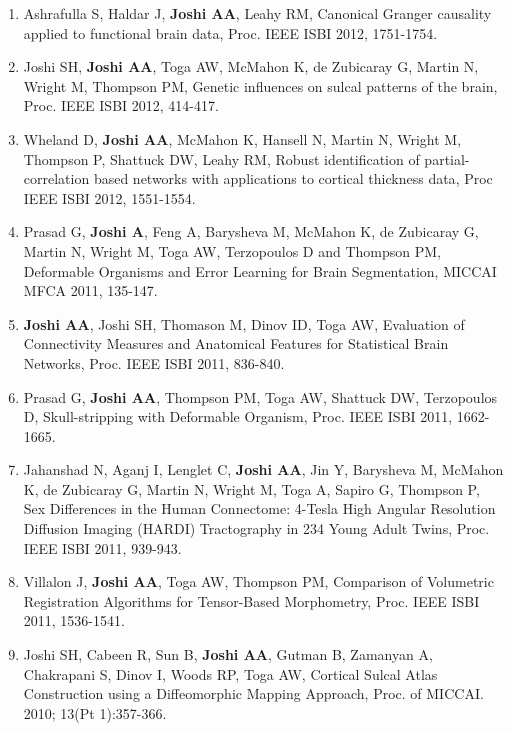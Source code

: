\documentclass[overlapped,line,letterpaper]{res}
\begin{document}
\begin{resume}
\begin{enumerate}
    \item Ashrafulla S, Haldar J, \textbf{Joshi AA}, Leahy RM, {Canonical Granger causality applied to functional brain data}, Proc. IEEE ISBI 2012, 1751-1754.

    \item Joshi SH, \textbf{Joshi AA}, Toga AW, McMahon K, de Zubicaray G, Martin N, Wright M, Thompson PM, {Genetic influences on sulcal patterns of the brain}, Proc. IEEE ISBI 2012, 414-417.

    \item Wheland D, \textbf{Joshi AA}, McMahon K, Hansell N, Martin N, Wright M, Thompson P, Shattuck DW, Leahy RM, {Robust identification of partial-correlation based networks with applications to cortical thickness data}, Proc IEEE ISBI 2012, 1551-1554.

    \item Prasad  G, \textbf{Joshi A}, Feng A, Barysheva M, McMahon K, de Zubicaray G, Martin N, Wright M, Toga AW, Terzopoulos D and Thompson PM, {Deformable Organisms and Error Learning for Brain Segmentation}, MICCAI MFCA 2011, 135-147.

    \item \textbf{Joshi AA}, Joshi SH, Thomason M, Dinov ID, Toga AW, {Evaluation of Connectivity Measures and Anatomical Features for Statistical Brain Networks}, Proc. IEEE ISBI 2011, 836-840. 

    \item Prasad G, \textbf{Joshi AA}, Thompson PM, Toga AW, Shattuck DW, Terzopoulos D, {Skull-stripping with Deformable Organism}, Proc. IEEE ISBI 2011, 1662-1665. 

    \item Jahanshad N, Aganj I, Lenglet C, \textbf{Joshi AA}, Jin Y, Barysheva M, McMahon K, de Zubicaray G, Martin N, Wright M, Toga A, Sapiro G, Thompson P, {Sex Differences in the Human Connectome: 4-Tesla High Angular Resolution Diffusion Imaging (HARDI) Tractography in 234 Young Adult Twins}, Proc. IEEE ISBI 2011, 939-943.

    \item Villalon J, \textbf{Joshi AA}, Toga AW, Thompson PM, {Comparison of Volumetric Registration Algorithms for Tensor-Based Morphometry}, Proc. IEEE ISBI 2011, 1536-1541. 

    \item Joshi SH, Cabeen R, Sun B, \textbf{Joshi AA}, Gutman B, Zamanyan A, Chakrapani S, Dinov I, Woods RP, Toga AW, {Cortical Sulcal Atlas Construction using a Diffeomorphic Mapping Approach}, Proc. of MICCAI. 2010; 13(Pt 1):357-366.


\end{enumerate}
\end{resume}
\end{document}
